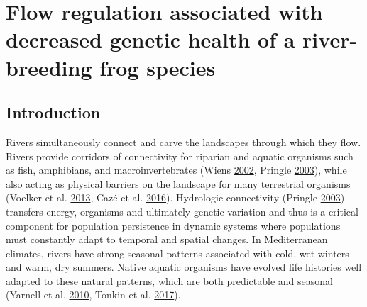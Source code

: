 \documentclass[proquest,12pt,final]{ucthesis-CA2012} %
\begin{document}
\begin{ucmainmatter}

\hypertarget{reg-health}{%
\chapter{Flow regulation associated with decreased genetic health of a
river-breeding frog species}\label{reg-health}}

\hypertarget{introduction}{%
\section{Introduction}\label{introduction}}

Rivers simultaneously connect and carve the landscapes through which
they flow. Rivers provide corridors of connectivity for riparian and
aquatic organisms such as fish, amphibians, and macroinvertebrates
(Wiens \protect\hyperlink{ref-wiens_riverine_2002}{2002}, Pringle
\protect\hyperlink{ref-pringle_what_2003}{2003}), while also acting as
physical barriers on the landscape for many terrestrial organisms
(Voelker et al. \protect\hyperlink{ref-voelker_river_2013}{2013}, Cazé
et al. \protect\hyperlink{ref-caze_could_2016}{2016}). Hydrologic
connectivity (Pringle \protect\hyperlink{ref-pringle_what_2003}{2003})
transfers energy, organisms and ultimately genetic variation and thus is
a critical component for population persistence in dynamic systems where
populations must constantly adapt to temporal and spatial changes. In
Mediterranean climates, rivers have strong seasonal patterns associated
with cold, wet winters and warm, dry summers. Native aquatic organisms
have evolved life histories well adapted to these natural patterns,
which are both predictable and seasonal (Yarnell et al.
\protect\hyperlink{ref-yarnell_ecology_2010}{2010}, Tonkin et al.
\protect\hyperlink{ref-tonkin_seasonality_2017}{2017}).


\end{ucmainmatter}
\end{document}
